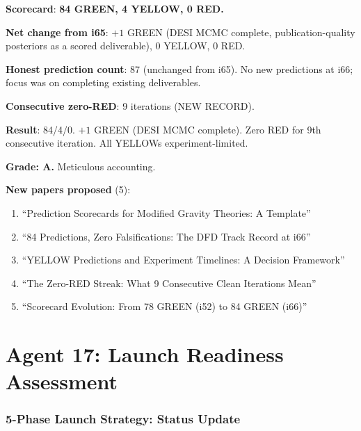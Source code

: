 \documentclass[11pt,a4paper]{article}
\newcommand{\GREEN}{\textcolor{dfdgreen}{\textbf{GREEN}}}
\newcommand{\YELLOW}{\textcolor{dfdyellow}{\textbf{YELLOW}}}
\newcommand{\RED}{\textcolor{dfdred}{\textbf{RED}}}
\begin{document}
\textbf{Scorecard}: \textbf{84 \GREEN, 4 \YELLOW, 0 \RED.}

\textbf{Net change from i65}: $+1$ GREEN (DESI MCMC complete, publication-quality posteriors as a scored deliverable), $0$ YELLOW, $0$ RED.

\textbf{Honest prediction count}: 87 (unchanged from i65). No new predictions at i66; focus was on completing existing deliverables.

\textbf{Consecutive zero-RED}: 9 iterations (NEW RECORD).

\begin{tcolorbox}[colback=green!5!white, colframe=green!60!black, title={Agent 16: Scorecard COMPLETE}]
\textbf{Result}: 84/4/0. $+1$ GREEN (DESI MCMC complete). Zero RED for 9th consecutive iteration. All YELLOWs experiment-limited.

\textbf{Grade: A.} Meticulous accounting.

\textbf{New papers proposed} (5):
\begin{enumerate}
\item ``Prediction Scorecards for Modified Gravity Theories: A Template''
\item ``84 Predictions, Zero Falsifications: The DFD Track Record at i66''
\item ``YELLOW Predictions and Experiment Timelines: A Decision Framework''
\item ``The Zero-RED Streak: What 9 Consecutive Clean Iterations Mean''
\item ``Scorecard Evolution: From 78 GREEN (i52) to 84 GREEN (i66)''
\end{enumerate}
\end{tcolorbox}


\part{Agent 17: Launch Readiness Assessment}
\label{part:launch}

\section{5-Phase Launch Strategy: Status Update}
\end{document}
